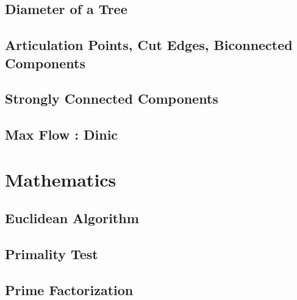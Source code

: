 \documentclass[10pt,landscape,twocolumn,a4paper,notitlepage]{article}
\begin{document}
  \subsection{Diameter of a Tree}
  

  \subsection{Articulation Points, Cut Edges, Biconnected Components}
  

  \subsection{Strongly Connected Components}
  

  \subsection{Max Flow : Dinic}
  
  
%   

\section{Mathematics}

  \subsection{Euclidean Algorithm}
  

  \subsection{Primality Test}
  

  \subsection{Prime Factorization}
  
\end{document}
